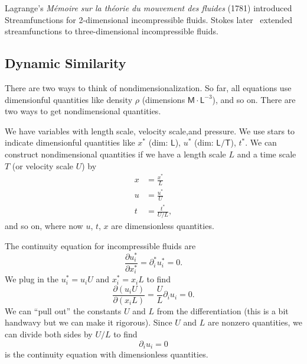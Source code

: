 \begin{remark}[History]
Lagrange's \textit{M\'{e}moire sur la th\'{e}orie du mouvement des fluides}
(1781) introduced Streamfunctions for 2-dimensional incompressible
fluids. Stokes later~\cite{stokes1842steady} extended streamfunctions
to three-dimensional incompressible fluids.
\end{remark}

\subsection{Dynamic Similarity}

\begin{node}
There are two ways to think of nondimensionalization. So far, all
equations use dimensionful quantities like density $\rho$ (dimensions
$\mathsf{M}\cdot\mathsf{L}^{-3}$), and so on. There are two ways to
get nondimensional quantities.
\end{node}

\begin{node}
We have variables with length scale, velocity scale,and pressure. We
use stars to indicate dimensionful quantities like $x^{*}$ (dim:
$\mathsf{L}$), $u^{*}$ (dim: $\mathsf{L}/\mathsf{T}$), $t^{*}$.
We can construct nondimensional quantities if we have a length scale
$L$ and a time scale $T$ (or velocity scale $U$) by
\begin{subequations}
  \begin{align}
x &= \frac{x^{*}}{L}\\
u &= \frac{u^{*}}{U}\\
t &= \frac{t^{*}}{U/L},
  \end{align}
\end{subequations}
and so on, where now $u$, $t$, $x$ are dimensionless quantities.
\end{node}

\begin{node}
The continuity equation for incompressible fluids are
\begin{equation}
\frac{\partial u^{*}_{i}}{\partial x^{*}_{i}}=\partial^{*}_{i}u^{*}_{i}=0.
\end{equation}
We plug in the $u^{*}_{i}=u_{i}U$ and $x^{*}_{i}=x_{i}L$ to find
\begin{equation}
\frac{\partial(u_{i}U)}{\partial(x_{i}L)} = \frac{U}{L}\partial_{i}u_{i}=0.
\end{equation}
We can ``pull out'' the constants $U$ and $L$ from the differentiation
(this is a bit handwavy but we can make it rigorous). Since $U$ and
$L$ are nonzero quantities, we can divide both sides by $U/L$ to find
\begin{equation}
\partial_{i}u_{i}=0
\end{equation}
is the continuity equation with dimensionless quantities.
\end{node}


